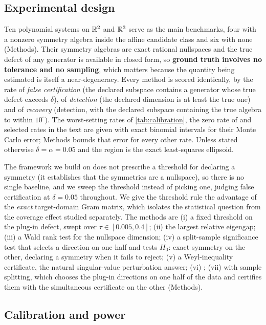 \subsection{Experimental design}
\label{sec:experiments}

Ten polynomial systems on $\mathbb{R}^2$ and $\mathbb{R}^3$ serve as the main benchmarks, four
with a nonzero symmetry algebra inside the affine candidate class and six with
none (Methods). Their symmetry algebras are exact rational nullspaces and the
true defect of any generator is available in closed form, so \textbf{ground
truth involves no tolerance and no sampling}, which matters because the
quantity being estimated is itself a near-degeneracy. Every method is scored
identically, by the rate of \emph{false certification} (the declared subspace
contains a generator whose true defect exceeds $\delta$), of \emph{detection}
(the declared dimension is at least the true one) and of \emph{recovery}
(detection, with the declared subspace containing the true algebra to within
$10^\circ$). The worst-setting rates of \cref{tab:calibration}, the zero rate
of \symcert{} and selected rates in the text are given with exact binomial
intervals for their Monte Carlo error; Methods bounds that error for every
other rate. Unless stated
otherwise $\delta = \alpha = 0.05$ and the region is the exact least-squares
ellipsoid.

The framework we build on does not prescribe a threshold for declaring a
symmetry (it establishes that the symmetries are a nullspace), so there is no
single baseline, and we sweep the threshold instead of picking one, judging
false certification at $\delta = 0.05$ throughout. We give the threshold rule
the advantage of the \emph{exact} target-domain Gram matrix, which isolates the
statistical question from the coverage effect studied separately. The methods
are (i) a fixed threshold on the plug-in defect, swept over $\tau \in [0.005,
0.4]$; (ii) the largest relative eigengap; (iii) a Wald rank test for the
nullspace dimension; (iv) a split-sample significance test that selects a
direction on one half and tests $H_0$: exact symmetry on the other, declaring a
symmetry when it fails to reject; (v) a Weyl-inequality certificate, the
natural singular-value perturbation answer; (vi) \symcert; (vii) \symcert{}
with sample splitting, which chooses the plug-in directions on one half of the
data and certifies them with the simultaneous certificate on the other
(Methods).

\subsection{Calibration and power}
\label{sec:calibration}

